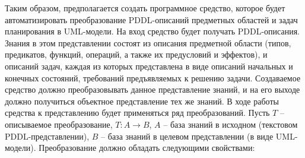 \documentclass[a4paper,14pt]{extreport}
\begin{document}
    Таким образом, предполагается создать программное средство, которое будет автоматизировать преобразование PDDL-описаний предметных областей и задач планирования в  UML-модели. На вход средство будет получать PDDL-описания. Знания в этом представлении состоят из описания предметной области (типов, предикатов, функций, операций, а также их предусловий и эффектов), и описаний задач, каждая из которых представлена в виде описаний начальных и конечных состояний, требований предъявляемых к решению задачи. 
Создаваемое средство должно преобразовывать данное представление знаний, и на его выходе должно получиться объектное представление тех же знаний. В ходе работы средства к представлению будет применяться ряд преобразований. Пусть $T$ -- описываемое преобразование, $T: A \to B$, $A$ -- база знаний в исходном (текстовом PDDL-представлении), $B$ -- база знаний в целевом представлении (в виде UML-модели). Преобразование должно обладать следующими свойствами:
\end{document}
